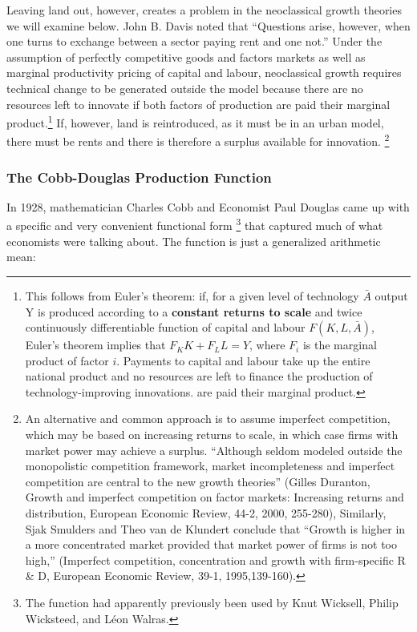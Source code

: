 Leaving land out, however, creates a problem in  the neoclassical growth theories we will examine below. John B. Davis \cite{davisRicardoTheoryProfit1993} noted that ``Questions arise, however, when one turns to exchange between a sector paying rent and one not.'' 
Under the assumption of perfectly competitive goods and factors markets as well as marginal productivity pricing of capital and labour, neoclassical growth requires technical change to be generated outside the model because there are no resources left to innovate if both factors of production are paid their marginal product.\footnote{This follows from Euler’s theorem: if, for a given level of technology $\bar A$ output Y is produced according to a \textbf{constant returns to scale} and twice continuously differentiable function of capital and labour $F(K, L, \bar A)$, Euler’s theorem implies that $F_K K + F_L L=Y$, where $F_i$ is the marginal product of factor $i$. Payments to  capital and labour take up the entire national product and no resources are left to finance the production of technology-improving innovations. are paid their marginal product.} 
If, however, land is reintroduced, as it must be in an urban model, there must be rents and there is therefore a surplus available for innovation.
\footnote{An alternative and common approach is to assume imperfect competition, which may be based on increasing returns to scale, in which case firms with market power may achieve a surplus. ``Although seldom modeled outside the monopolistic competition framework, market incompleteness and imperfect competition are central to the new growth theories'' (Gilles Duranton, Growth and imperfect competition on factor markets: Increasing returns and distribution, European Economic Review, 44-2, 2000, 255-280), Similarly, Sjak Smulders and Theo van de Klundert conclude that ``Growth is higher in a more concentrated market provided that market power of firms is not too high,'' (Imperfect competition, concentration and growth with firm-specific R \& D, European Economic Review, 39-1, 1995,139-160).}

\subsubsection{The Cobb-Douglas Production Function}

In 1928, mathematician Charles Cobb and Economist Paul Douglas came up with a specific and very convenient functional form \cite{cobbTheoryProduction1928}\footnote{The function had apparently previously been used by Knut Wicksell, Philip Wicksteed, and L\'eon Walras.} that captured much of what economists were talking about. The function is just a generalized arithmetic mean:
 
